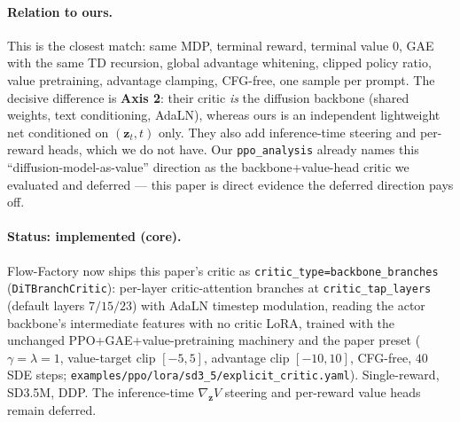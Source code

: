 \documentclass[11pt]{article}
\theoremstyle{remark}
\newcommand{\zt}{\bm{z}}
\begin{document}
\paragraph{Relation to ours.}
This is the closest match: same MDP, terminal reward, terminal value $0$, GAE with the
same TD recursion, global advantage whitening, clipped policy ratio, value pretraining,
advantage clamping, CFG-free, one sample per prompt. The decisive difference is
\textbf{Axis 2}: their critic \emph{is} the diffusion backbone (shared weights, text
conditioning, AdaLN), whereas ours is an independent lightweight net conditioned on
$(\zt_t,t)$ only. They also add inference-time steering and per-reward heads, which we
do not have. Our \texttt{ppo\_analysis} already names this ``diffusion-model-as-value''
direction as the backbone+value-head critic we evaluated and deferred --- this paper is
direct evidence the deferred direction pays off.

\paragraph{Status: implemented (core).}
Flow-Factory now ships this paper's critic as \texttt{critic\_type=backbone\_branches}
(\texttt{DiTBranchCritic}): per-layer critic-attention branches at \texttt{critic\_tap\_layers}
(default layers $7/15/23$) with AdaLN timestep modulation, reading the actor backbone's
intermediate features with no critic LoRA, trained with the unchanged PPO+GAE+value-pretraining
machinery and the paper preset ($\gamma=\lambda=1$, value-target clip $[-5,5]$, advantage clip
$[-10,10]$, CFG-free, $40$ SDE steps; \texttt{examples/ppo/lora/sd3\_5/explicit\_critic.yaml}).
Single-reward, SD3.5M, DDP. The inference-time $\nabla_{\zt}V$ steering and per-reward value
heads remain deferred.
\end{document}
